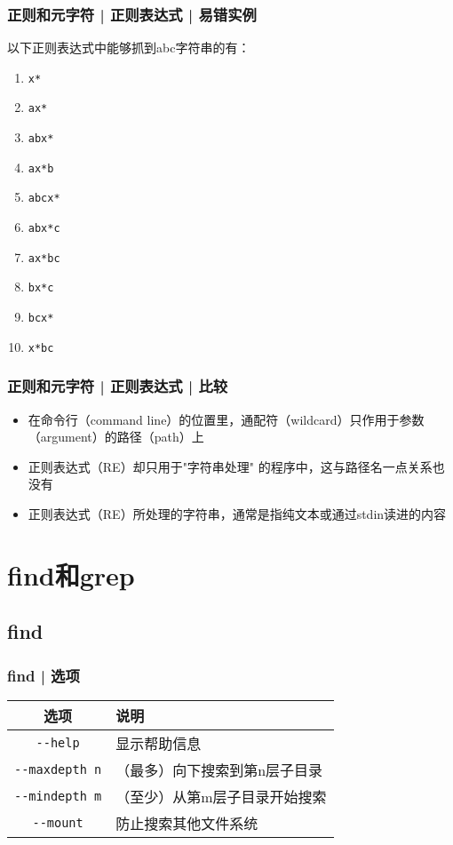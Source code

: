 \begin{frame}[fragile]
  \frametitle{正则和元字符 | 正则表达式 | 易错实例}
  \begin{block}{以下正则表达式中能够抓到abc字符串的有：}
    \begin{enumerate}
      \item \verb|x*|
      \item \verb|ax*|
      \item \verb|abx*|
      \item \verb|ax*b|
      \item \verb|abcx*|
      \item \verb|abx*c|
      \item \verb|ax*bc|
      \item \verb|bx*c|
      \item \verb|bcx*|
      \item \verb|x*bc|
    \end{enumerate}
  \end{block}
\end{frame}

\begin{frame}
  \frametitle{正则和元字符 | 正则表达式 | 比较}
  \begin{itemize}
    \item 在命令行（command line）的位置里，通配符（wildcard）只作用于参数（argument）的路径（path）上
    \item 正则表达式（RE）却只用于"字符串处理" 的程序中，这与路径名一点关系也没有
    \item 正则表达式（RE）所处理的字符串，通常是指纯文本或通过stdin读进的内容
  \end{itemize}
\end{frame}


\section{find和grep}
\subsection{find}
\begin{frame}[fragile]
  \frametitle{find | 选项}
  \begin{table}
    \centering
    \begin{tabularx}{0.9\textwidth}{cX}
      \hline
      \rowcolor{blue!50}选项 & 说明\\
      \hline
      \verb|--help| & 显示帮助信息\\
      \verb|--maxdepth n| & （最多）向下搜索到第n层子目录\\
      \verb|--mindepth m| & （至少）从第m层子目录开始搜索\\
      \verb|--mount| & 防止搜索其他文件系统\\
      \hline
    \end{tabularx}
  \end{table}
\end{frame}

